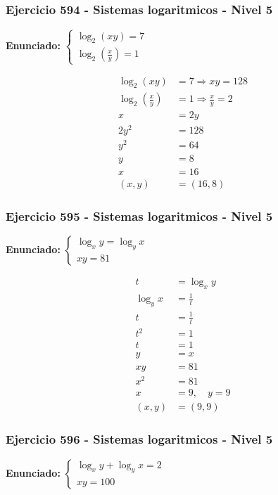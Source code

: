 \documentclass[12pt,a4paper]{article}
\begin{document}
\subsubsection*{Ejercicio 594 - Sistemas logaritmicos - Nivel 5}
\textbf{Enunciado:} \(\begin{cases}\log_2(xy)=7\\ \log_2\left(\frac{x}{y}\right)=1\end{cases}\)

\[
\begin{aligned}
\log_2(xy)&=7\Rightarrow xy=128\\
\log_2\left(\frac xy\right)&=1\Rightarrow \frac xy=2\\
x&=2y\\
2y^2&=128\\
y^2&=64\\
y&=8\\
x&=16\\
(x,y)&=\boxed{(16,8)}
\end{aligned}
\]


\subsubsection*{Ejercicio 595 - Sistemas logaritmicos - Nivel 5}
\textbf{Enunciado:} \(\begin{cases}\log_xy=\log_yx\\ xy=81\end{cases}\)

\[
\begin{aligned}
t&=\log_xy\\
\log_yx&=\frac1t\\
t&=\frac1t\\
t^2&=1\\
t&=1\\
y&=x\\
xy&=81\\
x^2&=81\\
x&=9,
\quad y=9\\
(x,y)&=\boxed{(9,9)}
\end{aligned}
\]


\subsubsection*{Ejercicio 596 - Sistemas logaritmicos - Nivel 5}
\textbf{Enunciado:} \(\begin{cases}\log_xy+\log_yx=2\\ xy=100\end{cases}\)
\end{document}
